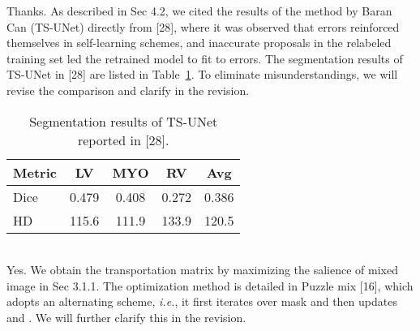 \documentclass[10pt,twocolumn,letterpaper]{article}
\begin{document}
\newline{}
Thanks. As described in Sec 4.2, we cited the results of the method by Baran Can (TS-UNet) directly from [28], where it was observed that errors reinforced themselves in self-learning schemes, and inaccurate proposals in the relabeled training set led the retrained model to fit to errors.
The segmentation results of TS-UNet in [28] are listed in Table~\ref{tab:tab1}.
To eliminate misunderstandings, we will revise the comparison and clarify in the revision.
\begin{table}[!h]
  \centering
  \caption{Segmentation results of TS-UNet reported in [28].}
  \begin{tabular}{@{}lcccc@{}}
    \toprule
    Metric & LV & MYO & RV & Avg \\
    \midrule
    Dice & 0.479& 0.408&0.272& 0.386\\
    HD & 115.6&111.9&133.9& 120.5\\
    \bottomrule
  \end{tabular}
  \label{tab:tab1}
\end{table}
\hfill
\\
\newline{}
Yes. We obtain the transportation matrix  by maximizing the salience of mixed image in Sec 3.1.1. 
The optimization method is detailed in Puzzle mix [16], which adopts an alternating scheme, \textit{i.e.}, it first iterates over mask  and then updates  and .
We will further clarify this in the revision.
\hfill
\\
\end{document}
